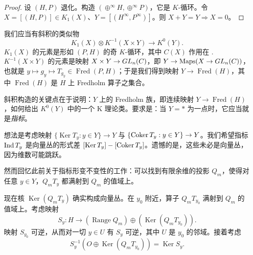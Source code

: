 \begin{proof}
设 $(H,P)$ 退化。构造 $(\oplus^{\infty}H,\oplus^{\infty}P)$，它是 $K$-循环。令 $X=[(H,P)]\in K_1(X)$、$Y=[(H^{\infty},P^{\infty})]$。则 $X+Y=Y\Rightarrow X=0$。
\end{proof}


我们应当有斜积的类似物
\[ K_1(X)\otimes K^{-1}(X\times Y)\to K^0(Y). \]
$K_1(X)$ 的元素是形如 $(P,H)$ 的奇 $K$-循环，其中 $C(X)$ 作用在 .  $K^{-1}(X\times Y)$ 的元素是映射 $X\times Y\to GL_n(C)$，即 $Y\to\operatorname{Maps}(X\to GL_n(C))$，也就是 $y\mapsto g_y\mapsto T_{g_y}\in\operatorname{Fred}(P,H)$；于是我们得到映射 $Y\to\operatorname{Fred}(H)$，其中 $\operatorname{Fred}(H)$ 是 $H$ 上 Fredholm 算子之集合。


斜积构造的关键点在于说明：$Y$ 上的 Fredholm 族，即连续映射 $Y\to\operatorname{Fred}(H)$，如何给出 $K^0(Y)$ 中的一个 K 理论类。要求是：当 $Y=*$ 为一点时，它应当就是\emph{指标}。

想法是考虑映射 $\{\operatorname{Ker}T_y: y\in Y\}\to Y$ 与 $\{\operatorname{Coker} T_y: y\in Y\}\to Y$。我们希望指标 $\operatorname{Ind} T_y$ 是向量丛的形式差 $[\operatorname{Ker}T_y]-[\operatorname{Coker} T_y]$。遗憾的是，这些未必是向量丛，因为维数可能跳跃。

然而回忆此前关于指标形变不变性的工作：可以找到有限余维的投影 $Q_m$，使得对任意 $y\in Y$，$Q_mT_y$ 都满射到 $Q_m$ 的值域上。

现在核 $\operatorname{Ker}(Q_mT_y)$ 确实构成向量丛。在 $y_0$ 附近，算子 $Q_mT_{y_0}$ 满射到 $Q_m$ 的值域上。考虑映射
\[ S_y: H\to(\operatorname{Range}Q_m)\oplus(\operatorname{Ker}(Q_mT_{y_0})). \]
映射 $S_{y_0}$ 可逆，从而对一切 $y\in U$ 有 $S_y$ 可逆，其中 $U$ 是 $y_0$ 的邻域。接着考虑
\[ S_y^{-1}(O\oplus\operatorname{Ker}(Q_mT_{y_0}))=\operatorname{Ker}S_y. \]


